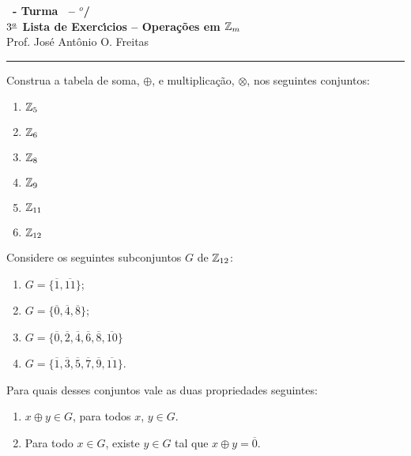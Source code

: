\documentclass[12pt]{exam}
\begin{document}
\begin{center}
{\Large\bf \disciplina\ - Turma \turma\ -- \semestre$^{o}$/\ano} \\ \vspace{9pt} {\large\bf
  $3^{\underline{a}}$ Lista de Exerc{\'\i}cios -- Operações em $\mathbb{Z}_m$}\\ \vspace{9pt} Prof. Jos{\'e} Ant{\^o}nio O. Freitas
\end{center}
\hrule

\vspace{.6cm}

\questao{} Construa a tabela de soma, $\oplus$, e multiplicação, $\otimes$, nos seguintes conjuntos:
\begin{multicols}{3}
	\begin{enumerate}[label=({\alph*})]
		\item $\mathbb{Z}_5$
		\item $\mathbb{Z}_6$
		\item $\mathbb{Z}_8$
		\item $\mathbb{Z}_9$
		\item $\mathbb{Z}_{11}$
		\item $\mathbb{Z}_{12}$
	\end{enumerate}
\end{multicols}

\vspace{.3cm}

\questao{} Considere os seguintes subconjuntos $G$ de $\mathbb{Z}_{12}$:
\begin{multicols}{2}
	\begin{enumerate}[label=({\alph*})]
		\item $G=\{\overline{1},\overline{11}\}$;

		\item $G=\{\overline{0},\overline{4},\overline{8}\}$;

		\item $G=\{\overline{0},\overline{2},\overline{4},\overline{6},\overline{8},\overline{10}\}$
		\item $G=\{\overline{1}, \overline{3},\overline{5},\overline{7},\overline{9},\overline{11}\}$.
	\end{enumerate}
\end{multicols}

Para quais desses conjuntos vale as duas propriedades seguintes:
\begin{enumerate}[label=({\roman*})]
	\item $x \oplus y \in G$, para todos $x$, $y \in G$.
	\item Para todo $x \in G$, existe $y \in G$ tal que $x \oplus y = \overline{0}$.
\end{enumerate}
\end{document}
